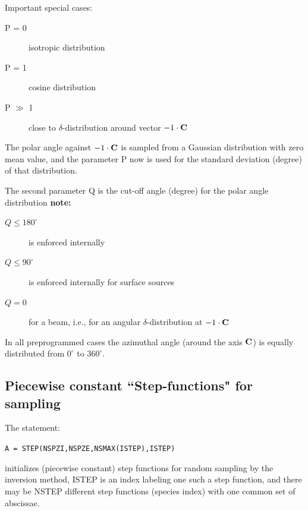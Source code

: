 \begin{description}
\begin{description}
\begin{description}
                        Important special cases:
                        \begin{description}
                          \item[P = 0] isotropic distribution
                          \item[P = 1] cosine distribution
                          \item[P
                                $\gg$ 1] close to $\delta$-distribution around vector $-1  \cdot \mathbf{C} $
                        \end{description}
                  \item[$= 2$] The polar angle against $-1  \cdot  \mathbf{C} $ is
                        sampled from a Gaussian distribution with zero mean value, and the parameter P
                        now is used for the standard deviation (degree) of that distribution.
                \end{description}
        \end{description}
        The second parameter Q is the cut-off angle (degree) for the polar angle
        distribution \textbf{note:} 

        \begin{description}
          \item[$Q \le 180^{\circ}$] is enforced internally
          \item[$Q
                  \le 90^{\circ}$] is enforced internally for surface sources
          \item[$Q = 0$]  for
                a beam, i.e., for an angular $\delta$-distribution at $-1  \cdot  \mathbf{C} $
        \end{description}
\end{description}
In all preprogrammed cases the azimuthal
angle (around the axis $\mathbf{C}$) is equally distributed from $0^{\circ}$ to
$360^{\circ}$.

\subsection{Piecewise constant ``Step-functions" for sampling}
\label{sec2.7.1}

The statement:

\lstinline|A = STEP(NSPZI,NSPZE,NSMAX(ISTEP),ISTEP)|

initializes (piecewise constant) step functions for random sampling by the
inversion method,
ISTEP is an index labeling one such a step function, and there may be NSTEP
different step functions (species index)
with one common set of abscissae.


